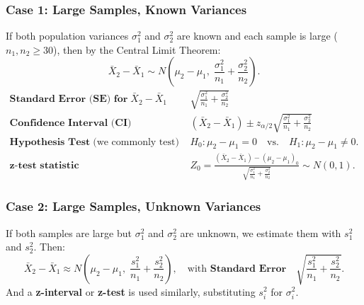 \documentclass[10pt]{extarticle}
\begin{document}
\subsubsection{Case 1: Large Samples, Known Variances}
If both population variances $\sigma_1^2$ and $\sigma_2^2$ are known and each sample is large ($n_1, n_2 \ge 30$), then by the Central Limit Theorem:
$$
    \bar{X}_2 - \bar{X}_1 \sim N\!\left(\mu_2 - \mu_1, \; \frac{\sigma_1^2}{n_1} + \frac{\sigma_2^2}{n_2}\right).
$$
\begin{align*}
    \textbf{Standard Error (SE) for} \; \bar{X}_2 - \bar{X}_1 \quad\quad & \sqrt{\frac{\sigma_1^2}{n_1} + \frac{\sigma_2^2}{n_2}}                                                                        \\
    \textbf{Confidence Interval (CI)} \quad\quad                         & (\bar{X}_2 - \bar{X}_1) \pm z_{\alpha/2} \sqrt{\frac{\sigma_1^2}{n_1} + \frac{\sigma_2^2}{n_2}}                               \\
    \textbf{Hypothesis Test} \; \text{(we commonly test)} \quad\quad     & H_0 : \mu_2 - \mu_1 = 0 \quad \text{vs.} \quad H_1 : \mu_2 - \mu_1 \neq 0.                                                    \\
    \textbf{z-test statistic} \quad\quad                                 & Z_0 = \frac{(\bar{X}_2 - \bar{X}_1) - (\mu_2 - \mu_1)_0}{\sqrt{\frac{\sigma_1^2}{n_1} + \frac{\sigma_2^2}{n_2}}} \sim N(0,1).
\end{align*}

\subsubsection{Case 2: Large Samples, Unknown Variances}
If both samples are large but $\sigma_1^2$ and $\sigma_2^2$ are unknown, we estimate them with $s_1^2$ and $s_2^2$. Then:
$$
    \bar{X}_2 - \bar{X}_1 \approx N\!\left(\mu_2 - \mu_1, \; \frac{s_1^2}{n_1} + \frac{s_2^2}{n_2}\right), \quad \text{with }\textbf{Standard Error} \quad \sqrt{\frac{s_1^2}{n_1} + \frac{s_2^2}{n_2}}.
$$
And a \textbf{z-interval} or \textbf{z-test} is used similarly, substituting $s_i^2$ for $\sigma_i^2$.
\end{document}
